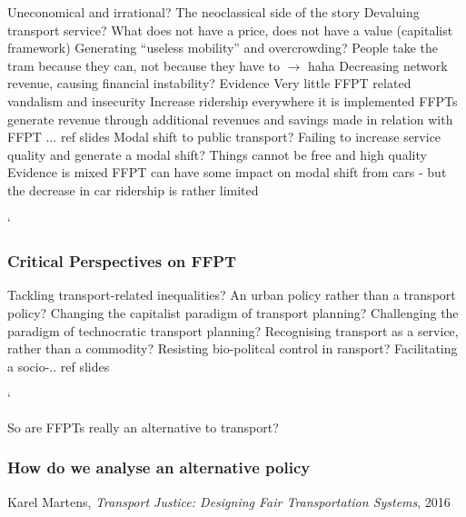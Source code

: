 \documentclass{article}
\begin{document}
\begin{outline}
	\1 Uneconomical and irrational? The neoclassical side of the story
		\2 Devaluing transport service? What does not have a price, does not have a value (capitalist framework)
		\2 Generating ``useless mobility'' and overcrowding? People take the tram because they can, not because they have to $\rightarrow$  haha
		\2 Decreasing network revenue, causing financial instability?
		\2 Evidence
			\3 Very little FFPT related vandalism and insecurity
			\3 Increase ridership everywhere it is implemented
			\3 FFPTs generate revenue through additional revenues and savings made in relation with FFPT
			\3 ... ref slides
	\1 Modal shift to public transport?
		\2 Failing to increase service quality and generate a modal shift? Things cannot be free and high quality
		\2 Evidence is mixed
			\3 FFPT can have some impact on modal shift from cars - but the decrease in car ridership is rather limited
\end{outline}`


\subsubsection{Critical Perspectives on FFPT}

\begin{outline}
	\1 Tackling transport-related inequalities?
	\1 An urban policy rather than a transport policy?
		\2 Changing the capitalist paradigm of transport planning? 
			\3 Challenging the paradigm of technocratic transport planning?
			\3 Recognising transport as a service, rather than a commodity?
			\3 Resisting bio-politcal control in ransport?
		\2 Facilitating a socio-.. ref slides
\end{outline}`

So are FFPTs really an alternative to transport?

\subsubsection{How do we analyse an alternative policy}

Karel Martens, \textit{Transport Justice: Designing Fair Transportation Systems}, 2016
\end{document}
